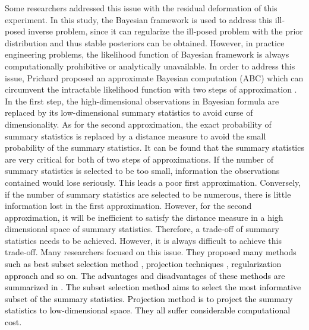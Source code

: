 \documentclass[review]{elsarticle}
\begin{document}
Some researchers \cite{taljat2004development,meng2015identification} addressed this issue with the residual deformation of this experiment. In this study, the Bayesian framework \cite{wang2016surrogate,lecampion2007model} is used to address this ill-posed inverse problem, since it can regularize the ill-posed problem with the prior distribution and thus stable posteriors can be obtained. However, in practice engineering problems, the likelihood function of Bayesian framework is always computationally prohibitive or analytically unavailable. In order to address this issue, Prichard \cite{pritchard1999population} proposed an approximate Bayesian computation (ABC) which can circumvent the intractable likelihood function with two steps of approximation \cite{blum2013comparative}. In the first step, the high-dimensional observations in Bayesian formula are replaced by its low-dimensional summary statistics to avoid curse of dimensionality. As for the second approximation, the exact probability of summary statistics is replaced by a distance measure to avoid the small probability of the summary statistics. It can be found that the summary statistics are very critical for both of two steps of approximations. If the number of summary statistics is selected to be too small, information the observations contained would lose seriously. This leads a poor first approximation. Conversely, if the number of summary statistics are selected to be numerous, there is little information lost in the first approximation. However, for the second approximation, it will be inefficient to satisfy the distance measure in a high dimensional space of summary statistics. Therefore, a trade-off of summary statistics needs to be achieved. However, it is always difficult to achieve this trade-off. Many researchers focused on this issue. \textcolor{black}{They proposed many methods such as  best subset selection method \cite{joyce2008approximately,nunes2010optimal}, projection techniques \cite{leuenberger2010bayesian,blum2010non,beaumont2002approximate,nott2014approximate,wegmann2009efficient,boulesteix2006partial,fearnhead2012constructing}, regularization approach \cite{beaumont2002approximate} and so on. The advantages and disadvantages of these methods are summarized in \cite{prangle2015summary}. The subset selection method\cite{joyce2008approximately,nunes2010optimal} aims to select the most informative subset of the summary statistics. Projection method\cite{leuenberger2010bayesian,blum2010non,beaumont2002approximate,nott2014approximate,wegmann2009efficient,boulesteix2006partial,fearnhead2012constructing} is to project the summary statistics to low-dimensional space. They all suffer considerable computational cost.} 
\end{document}
